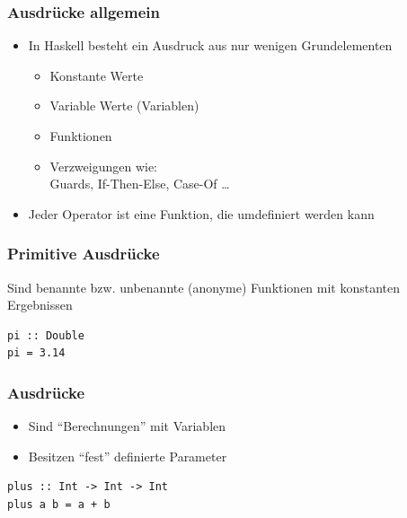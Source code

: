 \documentclass[fleqn,11pt,aspectratio=43]{beamer}
\begin{document}
\begin{frame}
\frametitle{Ausdrücke allgemein}
\begin{block}{\vspace*{-2ex}}
\begin{itemize}
  \item In Haskell besteht ein Ausdruck aus nur wenigen Grundelementen
  \begin{itemize}
    \item Konstante Werte
    \item Variable Werte (Variablen)
    \item Funktionen
    \item Verzweigungen wie:\\Guards, If-Then-Else, Case-Of \ldots
  \end{itemize}
  \item Jeder Operator ist eine Funktion, die umdefiniert werden kann
\end{itemize}
\end{block}
\end{frame}

\begin{frame}[fragile]
\frametitle{Primitive Ausdrücke}
\begin{block}{\vspace*{-2ex}}
Sind benannte bzw. unbenannte (anonyme) Funktionen mit konstanten Ergebnissen

\end{block}
\begin{lstlisting}
pi :: Double
pi = 3.14
\end{lstlisting}
\end{frame}

\begin{frame}[fragile]
\frametitle{Ausdrücke}
\begin{block}{\vspace*{-2ex}}
\begin{itemize}
\item Sind "`Berechnungen"' mit Variablen
\item Besitzen "`fest"' definierte Parameter
\end{itemize}
\end{block}
\begin{lstlisting}
plus :: Int -> Int -> Int
plus a b = a + b
\end{lstlisting}
\end{frame}
\end{document}
